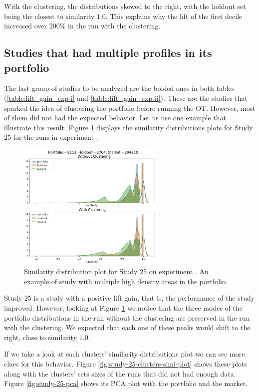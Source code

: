 With the clustering, the distributions skewed to the right, with the holdout set being the closest to similarity $1.0$. This explains why the lift of the first decile increased over $200\%$ in the run with the clustering.

\subsection{Studies that had multiple profiles in its portfolio}

The last group of studies to be analyzed are the bolded ones in both tables (\ref{table:lift_gain_exp-i} and \ref{table:lift_gain_exp-ii}). These are the studies that sparked the idea of clustering the portfolio before running the OT. However, most of them did not had the expected behavior. Let us use one example that illustrate this result. Figure \ref{fig:bump-study-25} displays the similarity distributions plots for Study 25 for the runs in experiment \nameExperimentII{}. 

\begin{figure}[H]
   \centering
   \includegraphics[width=7cm]{fig/ch4-bump-study-25.png}
   \caption{Similarity distribution plot for Study 25 on experiment \nameExperimentII{}. An example of study with multiple high density areas in the portfolio.}
   \label{fig:bump-study-25}
\end{figure}

Study 25 is a study with a positive lift gain, that is, the performance of the study improved. However, looking at Figure \ref{fig:bump-study-25} we notice that the three modes of the portfolio distributions in the run without the clustering are preserved in the run with the clustering. We expected that each one of these peaks would shift to the right, close to similarity $1.0$. 

If we take a look at each clusters' similarity distributions plot we can see more clues for this behavior. Figure \ref{fig:study-25-clusters-simi-plot} shows these plots along with the clusters' sets sizes of the runs that did not had enough data. Figure \ref{fig:study-25-pca} shows its PCA plot with the portfolio and the market. 


